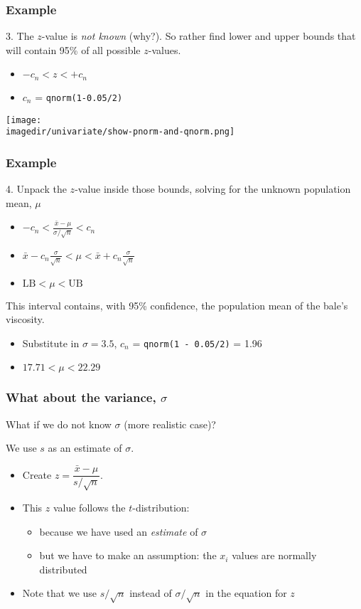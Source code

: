\begin{frame}\frametitle{Example}
	3. The $z$-value is \emph{not known} (why?). So rather find lower and upper bounds that will contain 95\% of all possible $z$-values.
	\begin{itemize}
		\item	$-c_n < z < +c_n$
		\item	$c_n$ = \texttt{qnorm(1-0.05/2)}
	\end{itemize}
	\begin{center}
		\texttt{[image: \\imagedir/univariate/show-pnorm-and-qnorm.png]}
	\end{center}
\end{frame}

\begin{frame}\frametitle{Example}
	4. Unpack the $z$-value inside those bounds, solving for the unknown population mean, $\mu$
	\begin{itemize}
		\item	$\displaystyle - c_n < \frac{\bar{x} - \mu}{\sigma / \sqrt{n}} < c_n$ 
		\item	$\displaystyle \bar{x} - c_n\frac{\sigma}{\sqrt{n}} < \mu < \bar{x} + c_n\frac{\sigma}{\sqrt{n}}$ 
		\item	$\displaystyle \text{LB} < \mu < \text{UB}$
	\end{itemize}

	This interval contains, with 95\% confidence, the population mean of the bale's viscosity.
	\begin{itemize}
		\item	Substitute in $\sigma = 3.5$, $c_n$ = \texttt{qnorm(1 - 0.05/2)} = 1.96
		\item	$17.71 < \mu < 22.29$
	\end{itemize}
\end{frame}

\begin{frame}\frametitle{What about the variance, $\sigma$}

	What if we do not know $\sigma$ (more realistic case)?

	We use $s$ as an estimate of $\sigma$.
	\begin{itemize}
		\item	Create $z = \dfrac{\bar{x} - \mu}{s/\sqrt{n}}$.
		\item	This $z$ value follows the $t$-distribution:
		\begin{itemize}
			\item	because we have used an \emph{estimate} of $\sigma$
			\item	but we have to make an assumption: the $x_i$ values are normally distributed
		\end{itemize}
		\item	Note that we use $s/\sqrt{n}$ instead of $\sigma/\sqrt{n}$ in the equation for $z$
	\end{itemize}
\end{frame}

